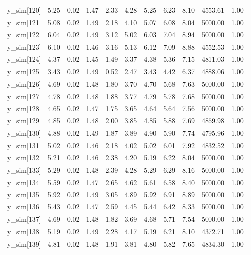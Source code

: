 \begin{table}[ht]
\begin{tabular}{rrrrrrrrrrr}
  y\_sim[120] & 5.25 & 0.02 & 1.47 & 2.33 & 4.28 & 5.25 & 6.23 & 8.10 & 4553.61 & 1.00 \\ 
  y\_sim[121] & 5.08 & 0.02 & 1.49 & 2.18 & 4.10 & 5.07 & 6.08 & 8.04 & 5000.00 & 1.00 \\ 
  y\_sim[122] & 6.04 & 0.02 & 1.49 & 3.12 & 5.02 & 6.03 & 7.04 & 8.94 & 5000.00 & 1.00 \\ 
  y\_sim[123] & 6.10 & 0.02 & 1.46 & 3.16 & 5.13 & 6.12 & 7.09 & 8.88 & 4552.53 & 1.00 \\ 
  y\_sim[124] & 4.37 & 0.02 & 1.45 & 1.49 & 3.37 & 4.38 & 5.36 & 7.15 & 4811.03 & 1.00 \\ 
  y\_sim[125] & 3.43 & 0.02 & 1.49 & 0.52 & 2.47 & 3.43 & 4.42 & 6.37 & 4888.06 & 1.00 \\ 
  y\_sim[126] & 4.69 & 0.02 & 1.48 & 1.80 & 3.70 & 4.70 & 5.68 & 7.63 & 5000.00 & 1.00 \\ 
  y\_sim[127] & 4.78 & 0.02 & 1.48 & 1.88 & 3.77 & 4.79 & 5.78 & 7.68 & 5000.00 & 1.00 \\ 
  y\_sim[128] & 4.65 & 0.02 & 1.47 & 1.75 & 3.65 & 4.64 & 5.64 & 7.56 & 5000.00 & 1.00 \\ 
  y\_sim[129] & 4.85 & 0.02 & 1.48 & 2.00 & 3.85 & 4.85 & 5.88 & 7.69 & 4869.98 & 1.00 \\ 
  y\_sim[130] & 4.88 & 0.02 & 1.49 & 1.87 & 3.89 & 4.90 & 5.90 & 7.74 & 4795.96 & 1.00 \\ 
  y\_sim[131] & 5.02 & 0.02 & 1.46 & 2.18 & 4.02 & 5.02 & 6.01 & 7.92 & 4832.52 & 1.00 \\ 
  y\_sim[132] & 5.21 & 0.02 & 1.46 & 2.38 & 4.20 & 5.19 & 6.22 & 8.04 & 5000.00 & 1.00 \\ 
  y\_sim[133] & 5.29 & 0.02 & 1.48 & 2.39 & 4.28 & 5.29 & 6.29 & 8.16 & 5000.00 & 1.00 \\ 
  y\_sim[134] & 5.59 & 0.02 & 1.47 & 2.65 & 4.62 & 5.61 & 6.58 & 8.40 & 5000.00 & 1.00 \\ 
  y\_sim[135] & 5.92 & 0.02 & 1.49 & 3.05 & 4.89 & 5.92 & 6.91 & 8.89 & 5000.00 & 1.00 \\ 
  y\_sim[136] & 5.43 & 0.02 & 1.47 & 2.59 & 4.45 & 5.44 & 6.42 & 8.33 & 5000.00 & 1.00 \\ 
  y\_sim[137] & 4.69 & 0.02 & 1.48 & 1.82 & 3.69 & 4.68 & 5.71 & 7.54 & 5000.00 & 1.00 \\ 
  y\_sim[138] & 5.19 & 0.02 & 1.49 & 2.28 & 4.17 & 5.19 & 6.21 & 8.10 & 4372.71 & 1.00 \\ 
  y\_sim[139] & 4.81 & 0.02 & 1.48 & 1.91 & 3.81 & 4.80 & 5.82 & 7.65 & 4834.30 & 1.00 \\ 

\end{tabular}
\end{table}
